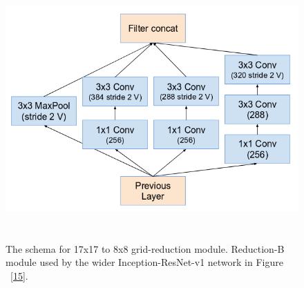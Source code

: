 \documentclass[a4paper,12pt, twoside]{NITKReport}
\begin{document}
 \begin{figure}[h]
\centering
    \includegraphics[height=10cm,width=13cm]{figure18.png}
    \caption{ The schema for 17x17 to 8x8 grid-reduction module. Reduction-B module used by the wider Inception-ResNet-v1 network in Figure ~\ref{15}.}
    \label{18}
 
\end{figure}
\end{document}
